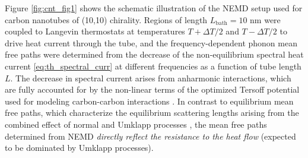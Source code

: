 
Figure \ref{fig:cnt_fig1} shows the schematic illustration of the NEMD setup used for carbon nanotubes of (10,10) chirality. Regions of length $L_{\textrm{bath}}=10$ nm were coupled to Langevin thermostats at temperatures $T+\Delta T/2$ and $T-\Delta T/2$ to drive heat current through the tube, and the frequency-dependent phonon mean free paths were determined from the decrease of the non-equilibrium spectral heat current \eqref{eq:th_spectral_curr} at different frequencies as a function of tube length $L$. The decrease in spectral current arises from anharmonic interactions, which are fully accounted for by the non-linear terms of the optimized Tersoff potential used for modeling carbon-carbon interactions \cite{tersoff88a,lindsay10}. In contrast to equilibrium mean free paths, which characterize the equilibrium scattering lengths arising from the combined effect of normal and Umklapp processes \cite{mcgaughey04}, the mean free paths determined from NEMD \textit{directly reflect the resistance to the heat flow} (expected to be dominated by Umklapp processes). %


